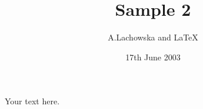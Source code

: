 \documentclass[12pt]{article}
\begin{document}
\title{Sample 2}
\author{A.Lachowska and \LaTeX}
\date{17th June 2003}
\maketitle


Your text here.
\end{document}
